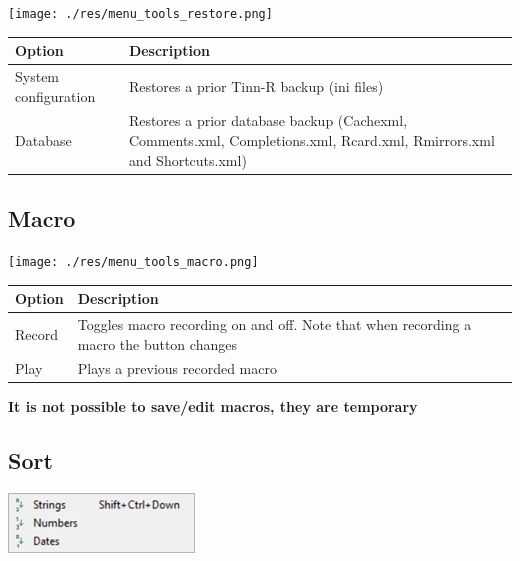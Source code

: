 \texttt{[image: ./res/menu\_tools\_restore.png]}\\

\begin{scriptsize}
  \begin{tabularx}{\textwidth}{>{\hsize=0.3\hsize}X>{\hsize=0.7\hsize}X}\\
    \hline
    \textbf{Option} & \textbf{Description} \\
    \hline
    System configuration & Restores a prior Tinn-R backup (ini files) \\
    Database & Restores a prior database backup
     (Cachexml, Comments.xml, Completions.xml, Rcard.xml, Rmirrors.xml and Shortcuts.xml) \\
    \hline
  \end{tabularx}
\end{scriptsize}


\hypertarget{menu_tools_macro}{}
\subsection{Macro}

\texttt{[image: ./res/menu\_tools\_macro.png]}\\

\begin{scriptsize}
  \begin{tabularx}{\textwidth}{>{\hsize=0.3\hsize}X>{\hsize=0.7\hsize}X}\\
    \hline
    \textbf{Option} & \textbf{Description} \\
    \hline
    Record & Toggles macro recording on and off. Note that when recording a macro the button changes \\
    Play & Plays a previous recorded macro \\
    \hline
  \end{tabularx}
\end{scriptsize}

\textbf{It is not possible to save/edit macros, they are temporary}


\hypertarget{menu_tools_sort}{}
\subsection{Sort}

\includegraphics[scale=0.50]{./res/menu_tools_sort.png}\\

